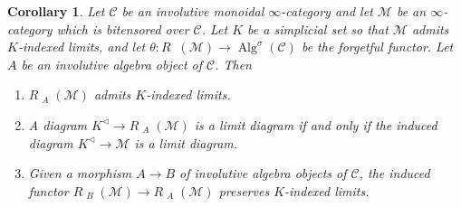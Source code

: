 \documentclass{article}
\DeclareMathOperator{\Alg}{Alg}
\DeclareMathOperator{\Modh}{{}^{\sigma}Mod} %
\newtheorem{corollary}[equation]{Corollary}
\theoremstyle{definition}
\begin{document}
\begin{corollary}
    Let $ \mathcal{C} $ be an involutive monoidal $ \infty $-category and let $ \mathcal{M} $ be an $ \infty $-category which is bitensored over $ \mathcal{C} $. 
    Let $ K $ be a simplicial set so that $ \mathcal{M} $ admits $ K $-indexed limits, and let $ \theta \colon R\Modh(\mathcal{M}) \to \Alg^\sigma(\mathcal{C}) $ be the forgetful functor. 
    Let $ A $ be an involutive algebra object of $ \mathcal{C} $. 
    Then
    \begin{enumerate}[label=(\arabic*)]
        \item $ R\Modh_A(\mathcal{M}) $ admits $ K $-indexed limits. 
        \item A diagram $ K^{\triangleleft} \to R\Modh_A(\mathcal{M}) $ is a limit diagram if and only if the induced diagram $ K^{\triangleleft} \to \mathcal{M} $ is a limit diagram. 
        \item Given a morphism $ A \to B $ of involutive algebra objects of $ \mathcal{C} $, the induced functor $ R\Modh_B(\mathcal{M}) \to R\Modh_A(\mathcal{M}) $ preserves $ K $-indexed limits. 
    \end{enumerate}
\end{corollary}
\end{document}
